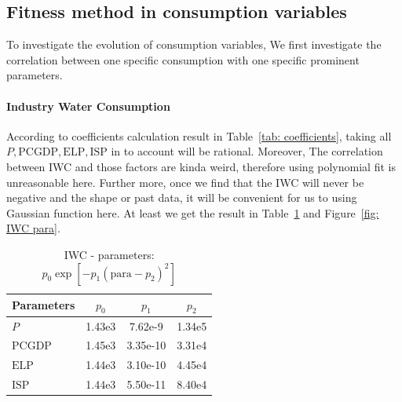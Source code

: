   \subsection{Fitness method in consumption variables}
  To investigate the evolution of consumption variables, We first investigate the correlation between one specific consumption with one specific prominent parameters.

  \paragraph{Industry Water Consumption}
  According to coefficients calculation result in Table~\ref{tab: coefficients}, taking all $P, \text{PCGDP}, \text{ELP}, \text{ISP}$ in to account will be rational. Moreover, The correlation between IWC and those factors are kinda weird, therefore using polynomial fit is unreasonable here. Further more, once we find that the IWC will never be negative and the shape or past data, it will be convenient for us to using Gaussian function here. At least we get the result in Table~\ref{tab:IWC - parameters} and Figure~\ref{fig: IWC para}.

  \begin{table}[!h]
  \centering
  \begin{tabular}{l||c|c|c}
  \hline
  Parameters & $p_0$  &  $p_1$  & $p_2$ \\ \hline
  $P$       &  1.43e3 & 7.62e-9 & 1.34e5 \\ \hline
  $\text{PCGDP}$ & 1.45e3 &  3.35e-10 & 3.31e4 \\ \hline
  $\text{ELP}$   & 1.44e3  &  3.10e-10 & 4.45e4 \\ \hline
  $\text{ISP}$   & 1.44e3  &  5.50e-11 & 8.40e4 \\ \hline
  \end{tabular}
  \caption{IWC - parameters: $p_0\exp{[-p_1 (\text{para}-p_2)^2]}$}
  \label{tab:IWC - parameters}
  \end{table}

